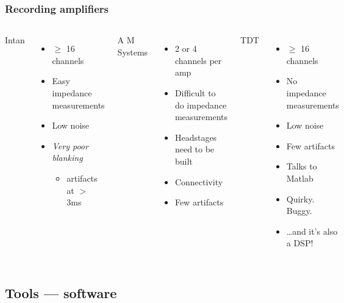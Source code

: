 \documentclass{beamer}
\begin{document}
\begin{frame}
  \frametitle{Recording amplifiers}
  \begin{columns}
    \column{33mm}
    Intan
    \begin{itemize}
      \item $\geq$ 16 channels
      \item Easy impedance measurements
      \item Low noise
      \item {\it Very poor blanking}
        \begin{itemize}
        \item artifacts at $>$ 3ms
        \end{itemize}
    \end{itemize}
    \column{33mm}
    A M Systems
    \begin{itemize}
      \item 2 or 4 channels per amp
      \item Difficult to do impedance measurements
      \item Headstages need to be built
      \item Connectivity
      \item Few artifacts
    \end{itemize}
    \column{33mm}
    TDT
    \begin{itemize}
      \item $\geq$ 16 channels
      \item No impedance measurements
      \item Low noise
      \item Few artifacts
      \item Talks to Matlab
      \item Quirky.  Buggy.
      \item \dots and it's also a DSP!
    \end{itemize}
  \end{columns}
\end{frame}

\subsection{Tools --- software}
\end{document}
